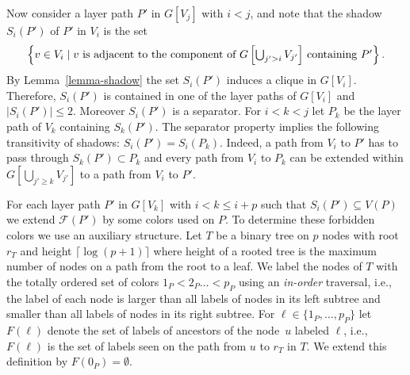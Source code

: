 \documentclass[11pt]{article}
\begin{document}
Now consider a layer path $P'$ in $G[V_j]$ with $i<j$, and note that
the
shadow $S_i(P')$ of $P'$ in $V_i$ is the set
\[
\left\{v\in V_i\mid \hbox{$v$ is adjacent to the component of $G\left[\bigcup_{j'>i} V_{j'}\right]$ containing $P'$}\right\}.
\]
By Lemma~\ref{lemma-shadow} the set $S_i(P')$
induces a clique in $G[V_i]$.
Therefore, $S_i(P')$ is contained in one of the layer paths of
$G[V_i]$ and $|S_i(P')|\leq 2$. Moreover $S_i(P')$ is a separator.
For $i<k<j$ let $P_k$ be the layer path of $V_k$ containing
$S_k(P')$. The separator property implies the following
transitivity of shadows:
$S_i(P') = S_i(P_k)$. Indeed, a path from $V_i$ to $P'$
has to pass through $S_k(P')\subset P_k$ and every path from
$V_i$ to $P_k$ can be extended within $G[\bigcup_{j'\geq k} V_{j'}]$
to a path from $V_i$ to $P'$.

For each layer path $P'$ in $G[V_k]$ with $i<k\leq i+p$ such that
$S_i(P') \subseteq V(P)$ we extend $\mathcal{F}(P')$ by some colors used on
$P$.  To determine these forbidden colors we use an auxiliary
structure.  Let $T$ be a binary tree on $p$ nodes with root $r_T$ and
height $\lceil \log(p+1)\rceil$ where height of a rooted tree is the
maximum number of nodes on a path from the root to a leaf.  We label
the nodes of $T$ with the totally ordered set of colors $1_P < 2_P\ldots <p_P$
using an \emph{in-order} traversal, i.e., the label of each node is
larger than all labels of nodes in its left subtree and smaller than
all labels of nodes in its right subtree. For
$\ell\in\{1_P,\ldots,p_P\}$ let~$F(\ell)$ denote the set of labels
of ancestors of the node~$u$ labeled $\ell$, i.e., $F(\ell)$ is the
set of labels seen on the path from $u$ to $r_T$ in $T$. We extend
this definition by $F(0_P)=\emptyset$.
\end{document}
